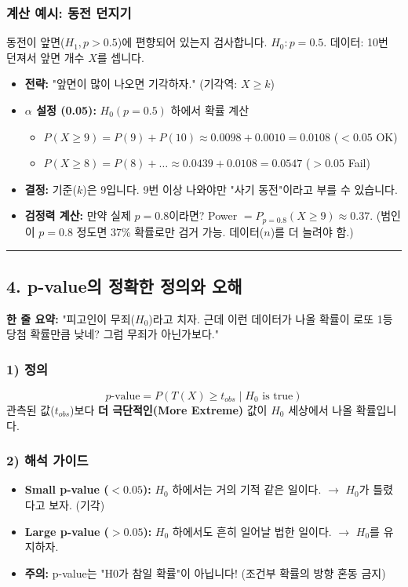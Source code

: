 \documentclass[11pt,a4paper]{book}
\theoremstyle{definition}
\begin{document}
\subsubsection*{계산 예시: 동전 던지기}
동전이 앞면($H_1, p>0.5$)에 편향되어 있는지 검사합니다. $H_0: p=0.5$.
데이터: 10번 던져서 앞면 개수 $X$를 셉니다.
\begin{itemize}
    \item \textbf{전략:} "앞면이 많이 나오면 기각하자." (기각역: $X \ge k$)
    \item \textbf{$\alpha$ 설정 (0.05):} $H_0(p=0.5)$ 하에서 확률 계산
    \begin{itemize}
        \item $P(X \ge 9) = P(9) + P(10) \approx 0.0098 + 0.0010 = 0.0108$ ($< 0.05$ OK)
        \item $P(X \ge 8) = P(8) + \dots \approx 0.0439 + 0.0108 = 0.0547$ ($> 0.05$ Fail)
    \end{itemize}
    \item \textbf{결정:} 기준($k$)은 9입니다. 9번 이상 나와야만 "사기 동전"이라고 부를 수 있습니다.
    \item \textbf{검정력 계산:} 만약 실제 $p=0.8$이라면?
    Power $= P_{p=0.8}(X \ge 9) \approx 0.37$. (범인이 $p=0.8$ 정도면 37\% 확률로만 검거 가능. 데이터($n$)를 더 늘려야 함.)
\end{itemize}

\vspace{0.5cm}\hrule\vspace{0.5cm}

\subsection{4. p-value의 정확한 정의와 오해}


\begin{conceptbox}[title={개념 4: 증거의 강도(Strength of Evidence)}]
\textbf{한 줄 요약:} "피고인이 무죄($H_0$)라고 치자. 근데 이런 데이터가 나올 확률이 로또 1등 당첨 확률만큼 낮네? 그럼 무죄가 아닌가보다."
\end{conceptbox}

\subsubsection*{1) 정의}
$$ p\text{-value} = P(T(X) \ge t_{obs} \mid H_0 \text{ is true}) $$
관측된 값($t_{obs}$)보다 \textbf{더 극단적인(More Extreme)} 값이 $H_0$ 세상에서 나올 확률입니다.

\subsubsection*{2) 해석 가이드}
\begin{itemize}
    \item \textbf{Small p-value ($< 0.05$):} $H_0$ 하에서는 거의 기적 같은 일이다. $\rightarrow$ $H_0$가 틀렸다고 보자. (기각)
    \item \textbf{Large p-value ($> 0.05$):} $H_0$ 하에서도 흔히 일어날 법한 일이다. $\rightarrow$ $H_0$를 유지하자.
    \item \textbf{주의:} p-value는 "H0가 참일 확률"이 아닙니다! (조건부 확률의 방향 혼동 금지)
\end{itemize}
\end{document}
